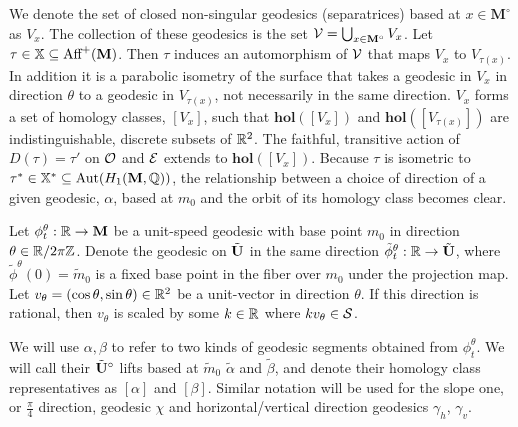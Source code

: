 \documentclass[]{article}
\def\hol{\mathbf{hol}}
\def\bM{\mathbf{M}}
\def\bMs{\mathbf{M}^\circ}
\def\btUs{\btU^\circ}
\def\mtild{\tilde{m}_0}
\def\tildphi{\tilde{\phi}}
\def\Aut{\mathrm{Aut}}
\begin{document}
We denote the set of closed non-singular geodesics (separatrices) based at $x\in\bMs$ as $V_{x}$. The collection of these geodesics is the set $\cV=\bigcup_{x\in\bMs} V_{x}$. Let $\tau\in\XX\subseteq \text{Aff}^{+}(\bM)$. Then $\tau$ induces an automorphism of $\mathcal{V}$ that maps $V_{x}$ to $V_{\tau(x)}$. In addition it is a parabolic isometry of the surface that takes a geodesic in $V_{x}$ in direction $\theta$ to a geodesic in $V_{\tau(x)}$, not necessarily in the same direction. $V_{x}$ forms a set of homology classes, $[V_{x}]$, such that $\hol([V_{x}])$ and $\hol([V_{\tau(x)}])$ are indistinguishable, discrete subsets of $\mathbb{R}^2$. The faithful, transitive action of $D(\tau)=\tau'$ on $\mathcal{O}$ and $\mathcal{E}$ extends to $\hol([V_{x}])$. Because $\tau$ is isometric to $\tau^*\in\XX^*\subseteq \Aut(H_1(\bM,\QQ))$, the relationship between a choice of direction of a given geodesic, $\alpha$, based at $m_0$ and the orbit of its homology class becomes clear.

\begin{Def}
Let $\phi_t^\theta:\RR\rightarrow\bM$ be a unit-speed geodesic with base point $m_0$ in direction $\theta\in \mathbb{R}/2\pi\mathbb{Z}$. Denote the geodesic on $\tilde{\mathbf{U}}$ in the same direction $\tildphi_t^\theta:\RR\rightarrow\btU$, where $\tildphi^\theta(0)=\mtild$ is a fixed base point in the fiber over $m_0$ under the projection map. Let $v_\theta=(\cos\theta,\sin\theta)\in\mathbb{R}^2$ be a unit-vector in direction $\theta$. If this direction is rational, then $v_\theta$ is scaled by some $k\in\mathbb{R}$ where $kv_\theta\in\mathcal{S}$.
\end{Def}

We will use $\alpha,\beta$ to refer to two kinds of geodesic segments obtained from $\phi_t^\theta$. We will call their $\btUs$ lifts based at $\mtild$ $\tilde{\alpha}$ and $\tilde{\beta}$, and denote their homology class representatives as $[\alpha]$ and $[\beta]$. Similar notation will be used for the slope one, or $\frac{\pi}{4}$ direction, geodesic $\chi$ and horizontal/vertical direction geodesics $\gamma_h$, $\gamma_v$.
\end{document}
